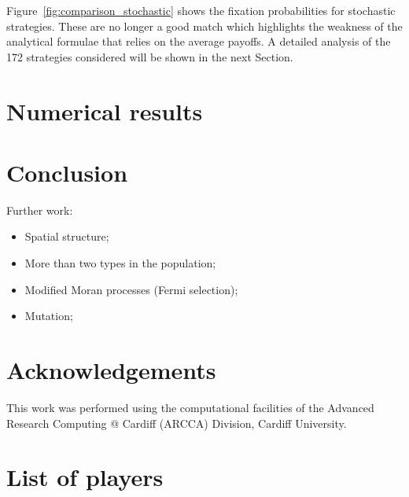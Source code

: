\documentclass{article}
\begin{document}
Figure~\ref{fig:comparison_stochastic} shows the fixation probabilities for
stochastic strategies. These are no longer a good match which highlights the
weakness of the analytical formulae that relies on the average payoffs. A
detailed analysis of the 172 strategies considered will be shown in the next
Section.

\section{Numerical results}\label{sec:numerical_results}






\section{Conclusion}\label{sec:conclusion}


Further work:

\begin{itemize}
    \item Spatial structure;
    \item More than two types in the population;
    \item Modified Moran processes (Fermi selection);
    \item Mutation;
\end{itemize}

\section*{Acknowledgements}

This work was performed using the computational facilities of the Advanced
Research Computing @ Cardiff (ARCCA) Division, Cardiff University.

\printbibliography

\appendix

\section{List of players}\label{app:list_of_players}

\begin{multicols}{3}
	\begin{enumerate}
		
	\end{enumerate}
\end{multicols}
\end{document}
